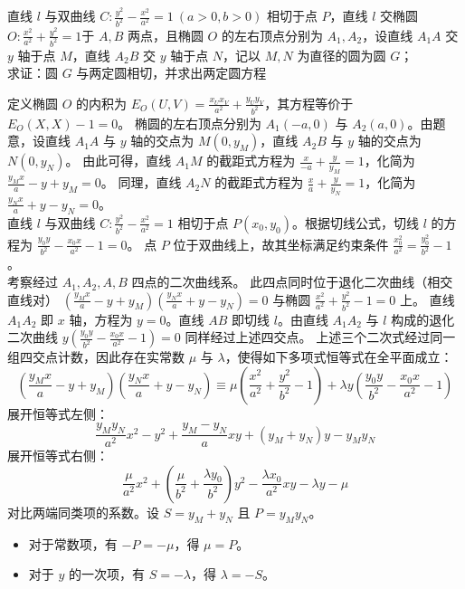 \begin{exercise}
直线 \(l\) 与双曲线 \(C: \frac{y^2}{b^2} - \frac{x^2}{a^2} = 1\ (a > 0, b > 0)\) 相切于点 \(P\)，直线 \(l\) 交椭圆$O: \frac{x^2}{a^2} + \frac{y^2}{b^2} = 1$于 \(A,B\) 两点，且椭圆 \(O\) 的左右顶点分别为 \(A_1,A_2\)，设直线 \(A_1A\) 交 \(y\) 轴于点 \(M\)，直线 \(A_2B\) 交 \(y\) 轴于点 \(N\)，记以 \(M,N\) 为直径的圆为圆 \(G\)；\\
求证：圆 \(G\) 与两定圆相切，并求出两定圆方程
\end{exercise}
\begin{solution}
定义椭圆 $O$ 的内积为 $E_O(U, V) = \frac{x_U x_V}{a^2} + \frac{y_U y_V}{b^2}$，其方程等价于 $E_O(X, X) - 1 = 0$。
椭圆的左右顶点分别为 $A_1(-a, 0)$ 与 $A_2(a, 0)$。由题意，设直线 $A_1A$ 与 $y$ 轴的交点为 $M(0, y_M)$，直线 $A_2B$ 与 $y$ 轴的交点为 $N(0, y_N)$。
由此可得，直线 $A_1M$ 的截距式方程为 $\frac{x}{-a} + \frac{y}{y_M} = 1$，化简为 $\frac{y_M x}{a} - y + y_M = 0$。
同理，直线 $A_2N$ 的截距式方程为 $\frac{x}{a} + \frac{y}{y_N} = 1$，化简为 $\frac{y_N x}{a} + y - y_N = 0$。\\
直线 $l$ 与双曲线 $C: \frac{y^2}{b^2} - \frac{x^2}{a^2} = 1$ 相切于点 $P(x_0, y_0)$。根据切线公式，切线 $l$ 的方程为 $\frac{y_0 y}{b^2} - \frac{x_0 x}{a^2} - 1 = 0$。
点 $P$ 位于双曲线上，故其坐标满足约束条件 $\frac{x_0^2}{a^2} = \frac{y_0^2}{b^2} - 1$。\\
考察经过 $A_1, A_2, A, B$ 四点的二次曲线系。
此四点同时位于退化二次曲线（相交直线对） $\left(\frac{y_M x}{a} - y + y_M\right)\left(\frac{y_N x}{a} + y - y_N\right) = 0$ 与椭圆 $\frac{x^2}{a^2} + \frac{y^2}{b^2} - 1 = 0$ 上。
直线 $A_1A_2$ 即 $x$ 轴，方程为 $y = 0$。直线 $AB$ 即切线 $l$。由直线 $A_1A_2$ 与 $l$ 构成的退化二次曲线 $y \left(\frac{y_0 y}{b^2} - \frac{x_0 x}{a^2} - 1\right) = 0$ 同样经过上述四交点。
上述三个二次式经过同一组四交点计数，因此存在实常数 $\mu$ 与 $\lambda$，使得如下多项式恒等式在全平面成立：
$$ \left(\frac{y_M x}{a} - y + y_M\right)\left(\frac{y_N x}{a} + y - y_N\right) \equiv \mu \left(\frac{x^2}{a^2} + \frac{y^2}{b^2} - 1\right) + \lambda y \left(\frac{y_0 y}{b^2} - \frac{x_0 x}{a^2} - 1\right) $$
展开恒等式左侧：
$$ \frac{y_M y_N}{a^2} x^2 - y^2 + \frac{y_M - y_N}{a} xy + (y_M + y_N)y - y_M y_N $$
展开恒等式右侧：
$$ \frac{\mu}{a^2} x^2 + \left(\frac{\mu}{b^2} + \frac{\lambda y_0}{b^2}\right) y^2 - \frac{\lambda x_0}{a^2} xy - \lambda y - \mu $$
对比两端同类项的系数。设 $S = y_M + y_N$ 且 $P = y_M y_N$。
\begin{itemize}
\item 对于常数项，有 $-P = -\mu$，得 $\mu = P$。
\item 对于 $y$ 的一次项，有 $S = -\lambda$，得 $\lambda = -S$。

\end{itemize}
\end{solution}

